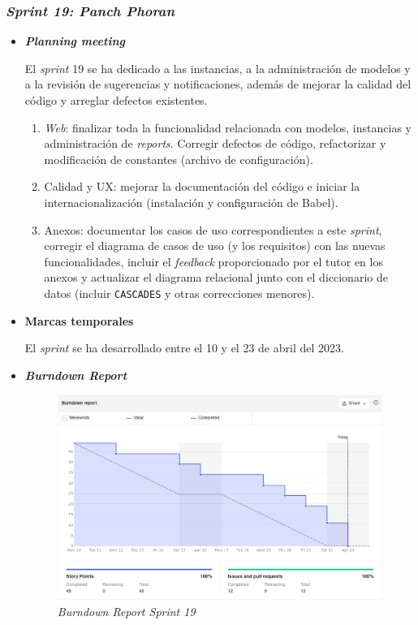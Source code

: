 \subsubsection{\textit{Sprint 19: Panch Phoran}}
\begin{itemize}
	\item \textbf{\textit{Planning meeting}}
	
	El \textit{sprint} 19 se ha dedicado a las instancias, a la administración de modelos y a la revisión de sugerencias y notificaciones, además de mejorar la calidad del código y arreglar defectos existentes.
	
	\begin{enumerate}
		\item \textit{Web}: finalizar toda la funcionalidad relacionada con modelos, instancias y administración de \textit{reports}. Corregir defectos de código, refactorizar y modificación de constantes (archivo de configuración).
		\item Calidad y UX: mejorar la documentación del código e iniciar la internacionalización (instalación y configuración de Babel).
		\item Anexos: documentar los casos de uso correspondientes a este \textit{sprint}, corregir el diagrama de casos de uso (y los requisitos) con las nuevas funcionalidades, incluir el \textit{feedback} proporcionado por el tutor en los anexos y actualizar el diagrama relacional junto con el diccionario de datos (incluir \texttt{CASCADES} y otras correcciones menores).
		
	\end{enumerate}
	\item \textbf{Marcas temporales}		
	
	El \textit{sprint} se ha desarrollado entre el 10 y el 23 de abril del 2023.
	
	\item \textbf{\textit{Burndown Report}}
	
	\begin{figure}[h]
		\caption[\textit{Sprint} 19: \textit{burndown report}]{\textit{Burndown Report Sprint 19}}
		\centering
		\includegraphics[width=\textwidth]{../img/anexos/bdr/s19_bdr}
	\end{figure}
	

\end{itemize}
